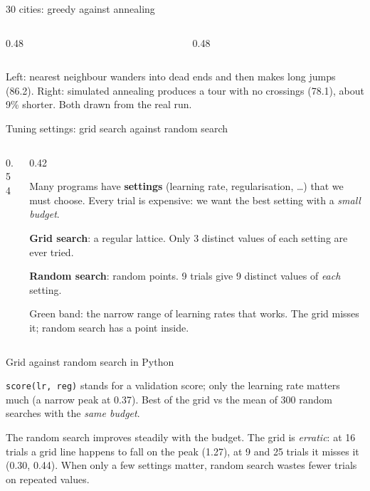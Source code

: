\documentclass[aspectratio=169,10pt]{beamer}
\newcommand{\figtab}[2][0.5]{\begin{sfig}[#1]\end{sfig}}
\begin{document}
\begin{frame}{30 cities: greedy against annealing}
\begin{columns}[T]
\begin{column}{0.48\textwidth}
\figtab[0.7]{fig_big_nn}
\end{column}
\begin{column}{0.48\textwidth}
\figtab[0.7]{fig_big_sa}
\end{column}
\end{columns}
\vspace{1mm}
{\small Left: nearest neighbour wanders into dead ends and then makes long jumps (86.2). Right: simulated annealing produces a tour with no crossings (78.1), about 9\% shorter. Both drawn from the real run.}
\end{frame}

\begin{frame}{Tuning settings: grid search against random search}
\begin{columns}[T]
\begin{column}{0.54\textwidth}
\figtab[0.7]{fig_search}
\end{column}
\begin{column}{0.42\textwidth}
{\small
Many programs have \textbf{settings} (learning rate, regularisation, \ldots) that we must choose. Every trial is expensive: we want the best setting with a \emph{small budget}.

\vspace{2mm}
\textbf{Grid search}: a regular lattice. Only 3 distinct values of each setting are ever tried.

\vspace{2mm}
\textbf{Random search}: random points. 9 trials give 9 distinct values of \emph{each} setting.

\vspace{2mm}
Green band: the narrow range of learning rates that works. The grid misses it; random search has a point inside.}
\end{column}
\end{columns}
\end{frame}

\begin{frame}[allowframebreaks]{Grid against random search in Python}
\framebreak
{}
\vspace{2mm}
{\small
\texttt{score(lr, reg)} stands for a validation score; only the learning rate matters much (a narrow peak at 0.37). Best of the grid vs the mean of 300 random searches with the \emph{same budget}.

\vspace{2mm}
The random search improves steadily with the budget. The grid is \emph{erratic}: at 16 trials a grid line happens to fall on the peak (1.27), at 9 and 25 trials it misses it (0.30, 0.44). When only a few settings matter, random search wastes fewer trials on repeated values.}
\end{frame}
\end{document}
